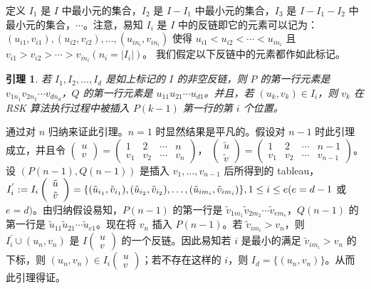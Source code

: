 \documentclass[a4paper,11pt,twoside]{book}
\newtheorem{lem}[thm]{引理}
\begin{document}
定义 $I_1$ 是 $I$ 中最小元的集合，$I_2$ 是 $I-I_1$
中最小元的集合，$I_3$ 是 $I-I_1-I_2$
中最小元的集合，$\cdots$。注意，易知 $I_i$ 是 $I$
中的反链即它的元素可以记为：$(u_{i1}, v_{i1}), (u_{i2}, v_{i2}),
\ldots, (u_{in_i}, v_{in_i})$ 使得 $u_{i1}<u_{i2}<\cdots<u_{in_i}$
且
$v_{i1}>v_{i2}>\cdots>v_{in_i}(n_i=|I_i|)$。
我们假定以下反链中的元素都作如此标记。


\begin{lem}\label{ya}  若 $I_1, I_2, \ldots, I_d$ 是如上标记的 $I$ 的非空反链，则 $P$ 的第一行元素是 $v_{1n_1}v_{2n_2}\cdots
v_{dn_d}$，$Q$ 的第一行元素是 $u_{11}u_{21}\cdots u_{d1}$。并且，若
$(u_k, v_k)\in I_i$，则 $v_k$ 在 RSK 算法执行过程中被插入 $P(k-1)$
第一行的第 $i$ 个位置。
\end{lem}


 通过对 $n$ 归纳来证此引理。$n=1$
时显然结果是平凡的。假设对 $n-1$ 时此引理成立，并且令
$\left(\begin{array}{c}
u\\v\end{array}\right)=\left(\begin{array}{cccc}
1&2&\cdots&n\\v_1&v_2&\cdots&v_n\end{array}\right)$，
$\left(\begin{array}{c}
\tilde{u}\\\tilde{v}\end{array}\right)=\left(\begin{array}{cccc}
1&2&\cdots&n-1\\v_1&v_2&\cdots&v_{n-1}\end{array}\right)$。 设
$(P(n-1), Q(n-1))$ 是插入 $v_1, \ldots, v_{n-1}$ 后所得到的
tableau，$I_i^{'} :=I_i\left(\begin{array}{c}
\tilde{u}\\\tilde{v}\end{array}\right)=\{(\tilde{u}_{i_1},
\tilde{v}_{i_1}),  (\tilde{u}_{i_2}, \tilde{v}_{i_2}), \ldots,
(\tilde{u}_{im_i}, \tilde{v}_{im_i})\},\\ 1\leq i\leq e(e=d-1$ 或
$e=d)$。由归纳假设易知，$P(n-1)$ 的第一行是
$\tilde{v}_{1m_1}\tilde{v}_{2m_2}\cdots\tilde{v}_{em_e}$，$Q(n-1)$
的第一行是
$\tilde{u}_{11}\tilde{u}_{21}\cdots\tilde{u}_{e1}$。现在将 $v_n$
插入 $P(n-1)$。若 $\tilde{v}_{im_i}>v_n$，则 $I_i^{'}\cup (u_n,
v_n)$ 是 $I\left(\begin{array}{c} u\\v\end{array}\right)$
的一个反链。因此易知若 $i$ 是最小的满足 $\tilde{v}_{im_i}>v_n$
的下标，则 $(u_n, v_n)\in I_i\left(\begin{array}{c}
u\\v\end{array}\right)$；若不存在这样的 $i$，则 $I_d=\{(u_n,
v_n)\}$。从而此引理得证。
\end{document}
